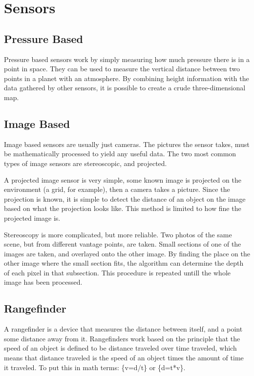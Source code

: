\clearpage
\section{Sensors}
\subsection{Pressure Based}
Pressure based sensors work by simply measuring how much pressure there is in a point in space. They can be used to measure the vertical distance between two points in a planet with an atmosphere\cite{barometric1}\cite{barometric2}. By combining height information with the data gathered by other sensors, it is possible to create a crude three-dimensional map.

\subsection{Image Based}
Image based sensors are usually just cameras. The pictures the sensor takes, must be mathematically processed to yield any useful data. The two most common types of image sensors are stereoscopic, and projected.

A projected image sensor is very simple, some known image is projected on the environment (a grid, for example), then a camera takes a picture. Since the projection is known, it is simple to detect the distance of an object on the image based on what the projection looks like. This method is limited to how fine the projected image is.

Stereoscopy is more complicated, but more reliable. Two photos of the same scene, but from different vantage points, are taken. Small sections of one of the images are taken, and overlayed onto the other image. By finding the place on the other image where the small section fits, the algorithm can determine the depth of each pixel in that subsection. This procedure is repeated untill the whole image has been processed.

\subsection{Rangefinder}%
A rangefinder is a device that measures the distance between itself, and a point some distance away from it. Rangefinders work based on the principle that the speed of an object is defined to be distance traveled over time traveled, which means that distance traveled is the speed of an object times the amount of time it traveled. To put this in math terms: \{v=d/t\} or \{d=t*v\}.

